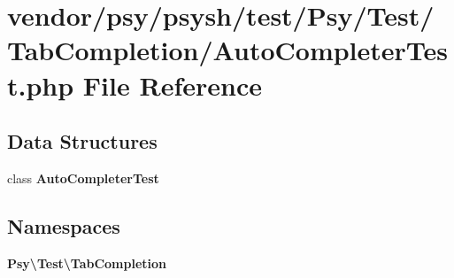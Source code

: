 \section{vendor/psy/psysh/test/\+Psy/\+Test/\+Tab\+Completion/\+Auto\+Completer\+Test.php File Reference}
\label{_auto_completer_test_8php}
\subsection*{Data Structures}
\begin{DoxyCompactItemize}
\item 
class {\bf Auto\+Completer\+Test}
\end{DoxyCompactItemize}
\subsection*{Namespaces}
\begin{DoxyCompactItemize}
\item 
 {\bf Psy\textbackslash{}\+Test\textbackslash{}\+Tab\+Completion}
\end{DoxyCompactItemize}
